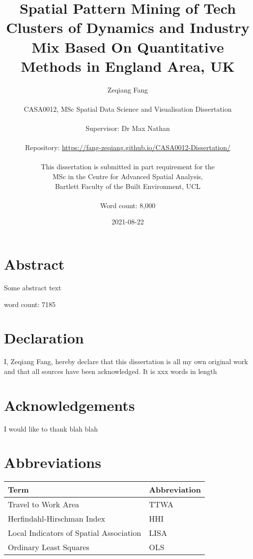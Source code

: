 \documentclass[
  12pt,
  oneside]{book}
\title{Spatial Pattern Mining of Tech Clusters of Dynamics and Industry Mix Based On Quantitative Methods in England Area, UK}
\author{Zeqiang Fang\\
~\\
CASA0012, MSc Spatial Data Science and Visualisation Dissertation\\
~\\
Supervisor: Dr Max Nathan\\
~\\
Repository: \url{https://fang-zeqiang.github.io/CASA0012-Dissertation/}\\
~\\
This dissertation is submitted in part requirement for the\\
MSc in the Centre for Advanced Spatial Analysis,\\
Bartlett Faculty of the Built Environment, UCL\\
~\\
Word count: 8,000}
\date{2021-08-22}
\begin{document}
\maketitle


\hypertarget{abstract}{%
\chapter*{Abstract}\label{abstract}}

Some abstract text

word count: 7185


\hypertarget{declaration}{%
\chapter*{Declaration}\label{declaration}}

I, Zeqiang Fang, hereby declare that this dissertation is all my own original work and that all sources have been acknowledged. It is xxx words in length

\hypertarget{acknowledgements}{%
\chapter*{Acknowledgements}\label{acknowledgements}}

I would like to thank blah blah

\setcounter{tocdepth}{3}
\tableofcontents
\listoffigures
\listoftables

\hypertarget{abbreviations}{%
\chapter*{Abbreviations}\label{abbreviations}}

\begin{table}
\centering
\begin{tabular}{ll}
\toprule
\textbf{Term} & \textbf{Abbreviation}\\
\midrule
Travel to Work Area & TTWA\\
Herfindahl-Hirschman Index & HHI\\
Local Indicators of Spatial Association & LISA\\
Ordinary Least Squares & OLS\\
\bottomrule
\end{tabular}
\end{table}
\end{document}
